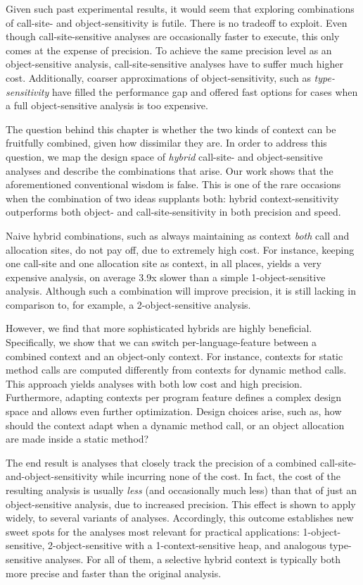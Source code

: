 Given such past experimental results, it would seem that exploring combinations of call-site- and object-sensitivity is futile. There is no tradeoff to exploit. Even though call-site-sensitive analyses are occasionally faster to execute, this only comes at the expense of precision. To achieve the same precision level as an object-sensitive analysis, call-site-sensitive analyses have to suffer much higher cost. Additionally, coarser approximations of object-sensitivity, such as \emph{type-sensitivity} \cite{popl:2011:Smaragdakis} have filled the performance gap and offered fast options for cases when a full object-sensitive analysis is too expensive.

The question behind this chapter is whether the two kinds of context can be fruitfully combined, given how dissimilar they are. In order to address this question, we map the design space of \emph{hybrid} call-site- and object-sensitive analyses and describe the combinations that arise. Our work shows that the aforementioned conventional wisdom is false. This is one of the rare occasions when the combination of two ideas supplants both: hybrid context-sensitivity outperforms both object- and call-site-sensitivity in both precision and speed.

Naive hybrid combinations, such as always maintaining as context \emph{both} call and allocation sites, do not pay off, due to extremely high cost. For instance, keeping one call-site and one allocation site as context, in all places, yields a very expensive analysis, on average 3.9x slower than a simple 1-object-sensitive analysis. Although such a combination will improve precision, it is still lacking in comparison to, for example, a 2-object-sensitive analysis.

However, we find that more sophisticated hybrids are highly beneficial. Specifically, we show that we can switch per-language-feature between a combined context and an object-only context. For instance, contexts for static method calls are computed differently from contexts for dynamic method calls. This approach yields analyses with both low cost and high precision. Furthermore, adapting contexts per program feature defines a complex design space and allows even further optimization. Design choices arise, such as, how should the context adapt when a dynamic method call, or an object allocation are made inside a static method?

The end result is analyses that closely track the precision of a combined call-site-and-object-sensitivity while incurring none of the cost. In fact, the cost of the resulting analysis is usually \emph{less} (and occasionally much less) than that of just an object-sensitive analysis, due to increased precision. This effect is shown to apply widely, to several variants of analyses. Accordingly, this outcome establishes new sweet spots for the analyses most relevant for practical applications: 1-object-sensitive, 2-object-sensitive with a 1-context-sensitive heap, and analogous type-sensitive \cite{popl:2011:Smaragdakis} analyses. For all of them, a selective hybrid context is typically both more precise and faster than the original analysis.

